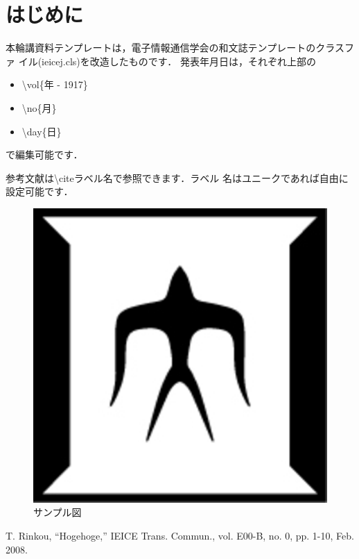 \documentclass[rinkou,a4paper,uplatex]{ieicej}
\begin{document}
\maketitle

\section{はじめに}
本輪講資料テンプレートは，電子情報通信学会の和文誌テンプレートのクラスファ
イル(ieicej.cls)を改造したものです．
発表年月日は，それぞれ上部の
\begin{itemize}
 \item \textbackslash vol\{年 - 1917\}
 \item \textbackslash no\{月\}
 \item \textbackslash day\{日\}
\end{itemize}
で編集可能です．

参考文献\cite{ref}は\textbackslash cite{ラベル名}で参照できます．ラベル
名はユニークであれば自由に設定可能です．

\begin{figure}[hh]
\centering
\includegraphics[scale=0.5]{fig.eps}
\caption{サンプル図}\label{tsubame}
\end{figure}

\begin{thebibliography}{9} %
 T. Rinkou, ``Hogehoge,'' IEICE Trans. Commun., vol. E00-B, no. 0,
	pp. 1-10, Feb. 2008.
\end{thebibliography}
\end{document}
